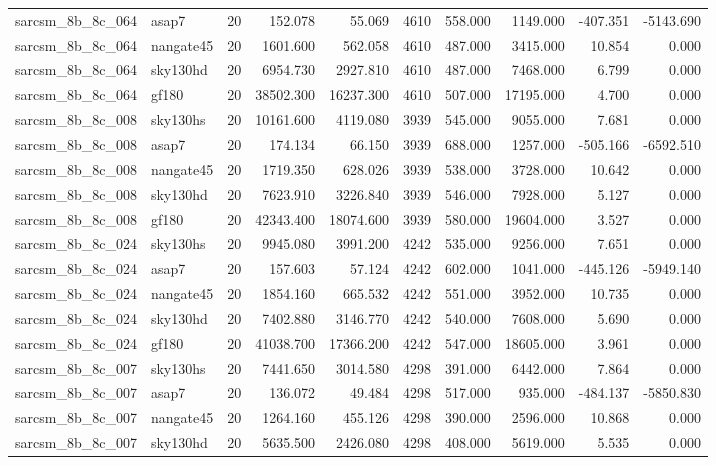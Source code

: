 \begin{longtable}{llrrrrrrrr}
sarcsm\_8b\_8c\_064 & asap7 & 20 & 152.078 & 55.069 & 4610 & 558.000 & 1149.000 & -407.351 & -5143.690 \\
sarcsm\_8b\_8c\_064 & nangate45 & 20 & 1601.600 & 562.058 & 4610 & 487.000 & 3415.000 & 10.854 & 0.000 \\
sarcsm\_8b\_8c\_064 & sky130hd & 20 & 6954.730 & 2927.810 & 4610 & 487.000 & 7468.000 & 6.799 & 0.000 \\
sarcsm\_8b\_8c\_064 & gf180 & 20 & 38502.300 & 16237.300 & 4610 & 507.000 & 17195.000 & 4.700 & 0.000 \\
sarcsm\_8b\_8c\_008 & sky130hs & 20 & 10161.600 & 4119.080 & 3939 & 545.000 & 9055.000 & 7.681 & 0.000 \\
sarcsm\_8b\_8c\_008 & asap7 & 20 & 174.134 & 66.150 & 3939 & 688.000 & 1257.000 & -505.166 & -6592.510 \\
sarcsm\_8b\_8c\_008 & nangate45 & 20 & 1719.350 & 628.026 & 3939 & 538.000 & 3728.000 & 10.642 & 0.000 \\
sarcsm\_8b\_8c\_008 & sky130hd & 20 & 7623.910 & 3226.840 & 3939 & 546.000 & 7928.000 & 5.127 & 0.000 \\
sarcsm\_8b\_8c\_008 & gf180 & 20 & 42343.400 & 18074.600 & 3939 & 580.000 & 19604.000 & 3.527 & 0.000 \\
sarcsm\_8b\_8c\_024 & sky130hs & 20 & 9945.080 & 3991.200 & 4242 & 535.000 & 9256.000 & 7.651 & 0.000 \\
sarcsm\_8b\_8c\_024 & asap7 & 20 & 157.603 & 57.124 & 4242 & 602.000 & 1041.000 & -445.126 & -5949.140 \\
sarcsm\_8b\_8c\_024 & nangate45 & 20 & 1854.160 & 665.532 & 4242 & 551.000 & 3952.000 & 10.735 & 0.000 \\
sarcsm\_8b\_8c\_024 & sky130hd & 20 & 7402.880 & 3146.770 & 4242 & 540.000 & 7608.000 & 5.690 & 0.000 \\
sarcsm\_8b\_8c\_024 & gf180 & 20 & 41038.700 & 17366.200 & 4242 & 547.000 & 18605.000 & 3.961 & 0.000 \\
sarcsm\_8b\_8c\_007 & sky130hs & 20 & 7441.650 & 3014.580 & 4298 & 391.000 & 6442.000 & 7.864 & 0.000 \\
sarcsm\_8b\_8c\_007 & asap7 & 20 & 136.072 & 49.484 & 4298 & 517.000 & 935.000 & -484.137 & -5850.830 \\
sarcsm\_8b\_8c\_007 & nangate45 & 20 & 1264.160 & 455.126 & 4298 & 390.000 & 2596.000 & 10.868 & 0.000 \\
sarcsm\_8b\_8c\_007 & sky130hd & 20 & 5635.500 & 2426.080 & 4298 & 408.000 & 5619.000 & 5.535 & 0.000 \\

\end{longtable}
